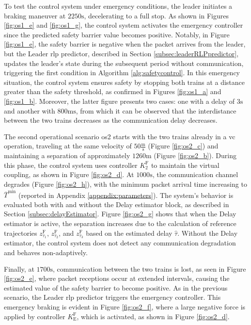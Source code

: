 \documentclass[letterpaper, 10 pt, conference]{ieeeconf}
\theoremstyle{definition}
\theoremstyle{nopoint}
\begin{document}
		To test the control system under emergency conditions, the leader initiates a braking maneuver at $2250\unit{\second}$, decelerating to a full stop. As shown in Figures \ref{fig:os1_e} and \ref{fig:os1_g}, the control system activates the emergency controller since the predicted safety barrier value becomes positive. Notably, in Figure \ref{fig:os1_e}, the safety barrier is negative when the packet arrives from the leader, but the Leader \gls{rlp} predictor, described in Section \ref{subsec:leaderRLPpredictor}, updates the leader's state during the subsequent period without communication, triggering the first condition in Algorithm \ref{alg:safetycontrol}. In this emergency situation, the control system ensures safety by stopping both trains at a distance greater than the safety threshold, as confirmed in Figures \ref{fig:os1_a} and \ref{fig:os1_b}. Moreover, the latter figure presents two cases: one with a delay of $3 \unit{\second}$ and another with $800  \unit{\milli\second}$, from which it can be observed that the interdistance between the two trains decreases as the communication delay decreases.
		
		The second operational scenario \gls{os}2 starts with the two trains already in a \gls{vc} operation, traveling at the same velocity of $50 \frac{\unit{\meter}}{\unit{\second}}$ (Figure \ref{fig:os2_c}) and maintaining a separation of approximately $1260 \unit{\meter}$ (Figure \ref{fig:os2_b}). During this phase, the control system uses controller $K_2^\mathrm{F}$ to maintain the virtual coupling, as shown in Figure \ref{fig:os2_d}. At $1000\unit{\second}$, the communication channel degrades (Figure \ref{fig:os2_h}), with the minimum packet arrival time increasing to $\overline{T}^{\mathrm{min}}$ (reported in Appendix \ref{appendix:parameters}). The system’s behavior is evaluated both with and without the Delay estimator block, as described in Section \ref{subsec:delayEstimator}. Figure \ref{fig:os2_g} shows that when the Delay estimator is active, the separation increases due to the calculation of reference trajectories $z_{\tau_1}^\mathrm{F}$, $z_{\tau_2}^\mathrm{F}$, and $z_{\tau_3}^\mathrm{F}$ based on the estimated delay $\hat{\tau}$. Without the Delay estimator, the control system does not detect any communication degradation and behaves non-adaptively.
		
		Finally, at $1700\unit{\second}$, communication between the two trains is lost, as seen in Figure \ref{fig:os2_e}, where packet receptions occur at extended intervals, causing the estimated value of the safety barrier to become positive. As in the previous scenario, the Leader \gls{rlp} predictor triggers the emergency controller. This emergency braking is evident in Figure \ref{fig:os2_f}, where a large negative force is applied by controller $K_{\mathrm{E}}^\mathrm{F}$, which is activated, as shown in Figure \ref{fig:os2_d}.
		
\end{document}
